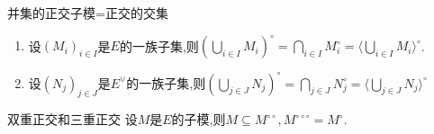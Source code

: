 \begin{proposition}{并集的正交子模=正交的交集}{}
	\begin{enumerate}
		\item 设$\left(M_{i}\right)_{i\in I}$是$E$的一族子集,则$\left(\bigcup\limits_{i\in I}M_{i}\right)^{\circ}=\bigcap\limits_{i\in I}M_{i}^{\circ}=\langle\bigcup\limits_{i\in I}M_{i}\rangle^{\circ}$.
		\item 设$\left(N_{j}\right)_{j\in J}$是$E^{\vee}$的一族子集,则$\left(\bigcup\limits_{j\in J}N_{j}\right)^{\circ}=\bigcap\limits_{j\in J}N_{j}^{\circ}=\langle\bigcup\limits_{j\in J}N_{j}\rangle^{\circ}$
\end{enumerate}
\end{proposition}

\begin{proposition}{双重正交和三重正交}{}
	设$M$是$E$的子模,则$M\subseteq M^{\circ\circ},M^{\circ\circ\circ}=M^{\circ}$.
\end{proposition}
